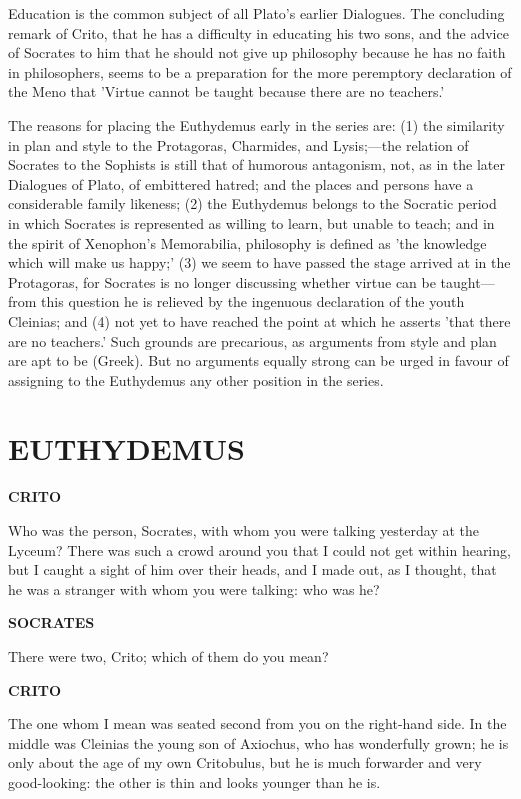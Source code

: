 \documentclass[11pt,letter]{article}
\begin{document}
\par  Education is the common subject of all Plato's earlier Dialogues. The concluding remark of Crito, that he has a difficulty in educating his two sons, and the advice of Socrates to him that he should not give up philosophy because he has no faith in philosophers, seems to be a preparation for the more peremptory declaration of the Meno that 'Virtue cannot be taught because there are no teachers.'

\par  The reasons for placing the Euthydemus early in the series are: (1) the similarity in plan and style to the Protagoras, Charmides, and Lysis;—the relation of Socrates to the Sophists is still that of humorous antagonism, not, as in the later Dialogues of Plato, of embittered hatred; and the places and persons have a considerable family likeness; (2) the Euthydemus belongs to the Socratic period in which Socrates is represented as willing to learn, but unable to teach; and in the spirit of Xenophon's Memorabilia, philosophy is defined as 'the knowledge which will make us happy;' (3) we seem to have passed the stage arrived at in the Protagoras, for Socrates is no longer discussing whether virtue can be taught—from this question he is relieved by the ingenuous declaration of the youth Cleinias; and (4) not yet to have reached the point at which he asserts 'that there are no teachers.' Such grounds are precarious, as arguments from style and plan are apt to be (Greek). But no arguments equally strong can be urged in favour of assigning to the Euthydemus any other position in the series.

\par 
\section{
      EUTHYDEMUS
    }  
\par \textbf{CRITO}
\par   Who was the person, Socrates, with whom you were talking yesterday at the Lyceum? There was such a crowd around you that I could not get within hearing, but I caught a sight of him over their heads, and I made out, as I thought, that he was a stranger with whom you were talking:  who was he?

\par \textbf{SOCRATES}
\par   There were two, Crito; which of them do you mean?

\par \textbf{CRITO}
\par   The one whom I mean was seated second from you on the right-hand side. In the middle was Cleinias the young son of Axiochus, who has wonderfully grown; he is only about the age of my own Critobulus, but he is much forwarder and very good-looking:  the other is thin and looks younger than he is.
\end{document}
